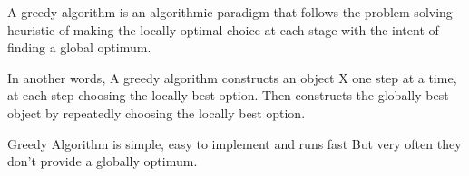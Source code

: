 A greedy algorithm is an algorithmic paradigm that follows the problem
solving heuristic of making the locally optimal choice at each stage with
the intent of finding a global optimum.

	In another words, A greedy algorithm 
constructs an object X one step at a time,
at each step choosing the locally best option.
	Then constructs the globally best object by
repeatedly choosing the locally best option.

Greedy Algorithm is simple, easy to implement and runs fast
But very often they don't provide a globally optimum.